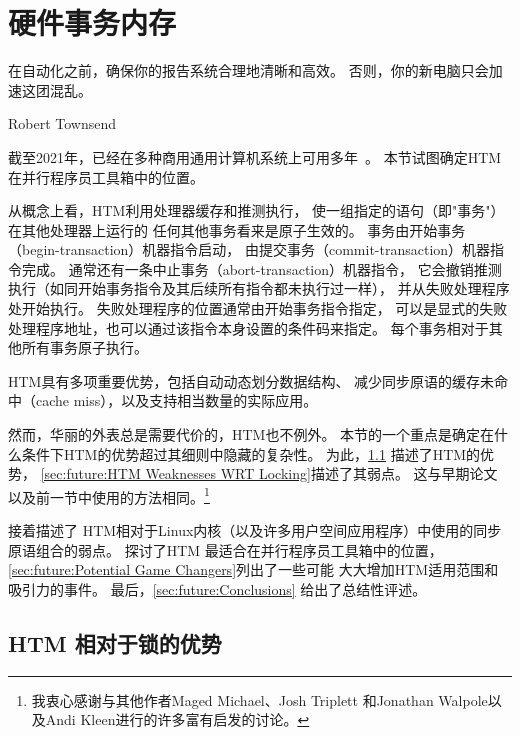 
\section{硬件事务内存}
\label{sec:future:Hardware Transactional Memory}
%
\epigraph{在自动化之前，确保你的报告系统合理地清晰和高效。
	  否则，你的新电脑只会加速这团混乱。}
	 {Robert Townsend}

截至2021年，已经在多种商用通用计算机系统上可用多年~\cite{Yoo:2013:PEI:2503210.2503232,RickMerrit2011PowerTM,ChristianJacobi2012MainframeTM,TimothyHayes2020ARM-HTM}。
本节试图确定HTM在并行程序员工具箱中的位置。

从概念上看，HTM利用处理器缓存和推测执行，
使一组指定的语句（即"事务"）在其他处理器上运行的
任何其他事务看来是原子生效的。
事务由开始事务（begin-transaction）机器指令启动，
由提交事务（commit-transaction）机器指令完成。
通常还有一条中止事务（abort-transaction）机器指令，
它会撤销推测执行（如同开始事务指令及其后续所有指令都未执行过一样），
并从失败处理程序处开始执行。
失败处理程序的位置通常由开始事务指令指定，
可以是显式的失败处理程序地址，也可以通过该指令本身设置的条件码来指定。
每个事务相对于其他所有事务原子执行。

HTM具有多项重要优势，包括自动动态划分数据结构、
减少同步原语的缓存未命中（cache miss），以及支持相当数量的实际应用。

然而，华丽的外表总是需要代价的，HTM也不例外。
本节的一个重点是确定在什么条件下HTM的优势超过其细则中隐藏的复杂性。
为此，\cref{sec:future:HTM Benefits WRT Locking}
描述了HTM的优势，
\cref{sec:future:HTM Weaknesses WRT Locking}描述了其弱点。
这与早期论文~\cite{McKenney2007PLOSTM,PaulEMcKenney2010OSRGrassGreener}
以及前一节中使用的方法相同。\footnote{
	我衷心感谢与其他作者Maged Michael、Josh Triplett
	和Jonathan Walpole以及Andi Kleen进行的许多富有启发的讨论。}

接着描述了
HTM相对于Linux内核（以及许多用户空间应用程序）中使用的同步原语组合的弱点。
探讨了HTM
最适合在并行程序员工具箱中的位置，
\cref{sec:future:Potential Game Changers}列出了一些可能
大大增加HTM适用范围和吸引力的事件。
最后，\cref{sec:future:Conclusions}
给出了总结性评述。

\subsection{HTM 相对于锁的优势}
\label{sec:future:HTM Benefits WRT Locking}

